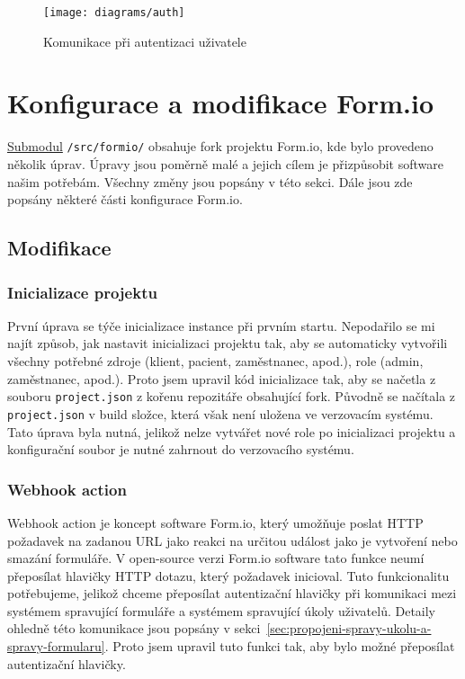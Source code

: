 \begin{figure}[H]
    \texttt{[image: diagrams/auth]}
    \caption{Komunikace při autentizaci uživatele}\label{fig:auth}
\end{figure}

\section{Konfigurace a modifikace Form.io}\label{sec:konfigurace-a-modifikace-form.io}

\href{https://git-scm.com/book/en/v2/Git-Tools-Submodules}{Submodul} \texttt{/src/formio/} obsahuje fork projektu Form.io, kde bylo provedeno několik úprav.
Úpravy jsou poměrně malé a jejich cílem je přizpůsobit software našim potřebám.
Všechny změny jsou popsány v této sekci.
Dále jsou zde popsány některé části konfigurace Form.io.

\subsection{Modifikace}\label{subsec:modifikace}

\subsubsection{Inicializace projektu}\label{subsubsec:inicializace-projektu}

První úprava se týče inicializace instance při prvním startu.
Nepodařilo se mi najít způsob, jak nastavit inicializaci projektu tak, aby se automaticky vytvořili všechny potřebné zdroje (klient, pacient, zaměstnanec, apod.), role (admin, zaměstnanec, apod.).
Proto jsem upravil kód inicializace tak, aby se načetla z souboru \texttt{project.json} z kořenu repozitáře obsahující fork.
Původně se načítala z \texttt{project.json} v build složce, která však není uložena ve verzovacím systému.
Tato úprava byla nutná, jelikož nelze vytvářet nové role po inicializaci projektu a konfigurační soubor je nutné zahrnout do verzovacího systému.

\subsubsection{Webhook action}\label{subsubsec:webhook-action}

Webhook action je koncept software Form.io, který umožňuje poslat HTTP požadavek na zadanou URL jako reakci na určitou událost jako je vytvoření nebo smazání formuláře.
V open-source verzi Form.io software tato funkce neumí přeposílat hlavičky HTTP dotazu, který požadavek inicioval.
Tuto funkcionalitu potřebujeme, jelikož chceme přeposílat autentizační hlavičky při komunikaci mezi systémem spravující formuláře a systémem spravující úkoly uživatelů.
Detaily ohledně této komunikace jsou popsány v sekci~\ref{sec:propojeni-spravy-ukolu-a-spravy-formularu}.
Proto jsem upravil tuto funkci tak, aby bylo možné přeposílat autentizační hlavičky.

